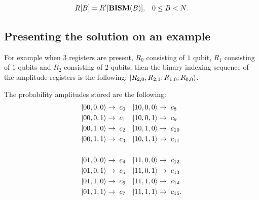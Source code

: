 \begin{align*}
R[B] = R'[\text{\textbf{BISM}}(B)], \hspace{3mm}0\leq{}B<N.
\end{align*}

\subsection{Presenting the solution on an example}

For example when 3 registers are present, $R_0$ consisting of $1$ qubit, $R_1$ consisting of $1$ qubits and $R_2$ consisting of $2$ qubits, then the binary indexing sequence of the amplitude registers is the following: $\ket{R_{2,0},R_{2,1};R_{1,0};R_{0,0}}$.

The probability amplitudes stored are the following:
\begin{align*}
\ket{00,0,0} \rightarrow & \hspace{2mm} c_{0} &
\ket{10,0,0} \rightarrow & \hspace{2mm} c_{8} \\
\ket{00,0,1} \rightarrow & \hspace{2mm} c_{1} &
\ket{10,0,1} \rightarrow & \hspace{2mm} c_{9} \\
\ket{00,1,0} \rightarrow & \hspace{2mm} c_{2} &
\ket{10,1,0} \rightarrow & \hspace{2mm} c_{10} \\
\ket{00,1,1} \rightarrow & \hspace{2mm} c_{3} &
\ket{10,1,1} \rightarrow & \hspace{2mm} c_{11} \\
\\
\ket{01,0,0} \rightarrow & \hspace{2mm} c_{4} &
\ket{11,0,0} \rightarrow & \hspace{2mm} c_{12} \\
\ket{01,0,1} \rightarrow & \hspace{2mm} c_{5} &
\ket{11,0,1} \rightarrow & \hspace{2mm} c_{13} \\
\ket{01,1,0} \rightarrow & \hspace{2mm} c_{6} &
\ket{11,1,0} \rightarrow & \hspace{2mm} c_{14} \\
\ket{01,1,1} \rightarrow & \hspace{2mm} c_{7} &
\ket{11,1,1} \rightarrow & \hspace{2mm} c_{15}. \\
\end{align*}

